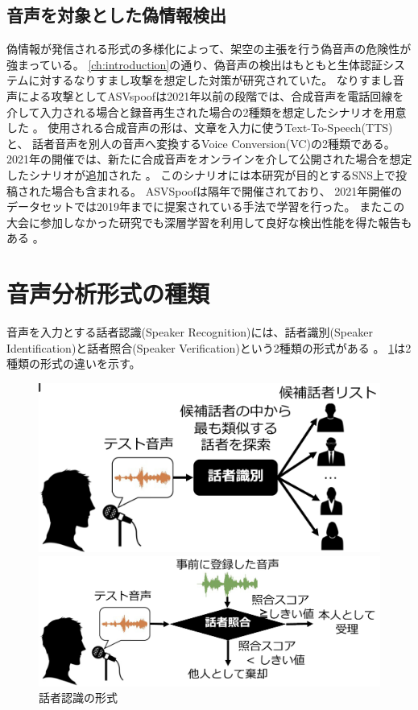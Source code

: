 \subsection{音声を対象とした偽情報検出}
偽情報が発信される形式の多様化によって、架空の主張を行う偽音声の危険性が強まっている。
\cref{ch:introduction}の通り、偽音声の検出はもともと生体認証システムに対するなりすまし攻撃を想定した対策が研究されていた。
なりすまし音声による攻撃としてASVspoofは2021年以前の段階では、合成音声を電話回線を介して入力される場合と録音再生された場合の2種類を想定したシナリオを用意した \cite{7858696}。
使用される合成音声の形は、文章を入力に使うText-To-Speech(TTS)と、
話者音声を別人の音声へ変換するVoice Conversion(VC)の2種類である。
2021年の開催では、新たに合成音声をオンラインを介して公開された場合を想定したシナリオが追加された \cite{yamagishi21_asvspoof}。
このシナリオには本研究が目的とするSNS上で投稿された場合も含まれる。
ASVSpoofは隔年で開催されており、
2021年開催のデータセットでは2019年までに提案されている手法で学習を行った。
またこの大会に参加しなかった研究でも深層学習を利用して良好な検出性能を得た報告もある \cite{10.1145/3394171.3413716}。

\section{音声分析形式の種類}
音声を入力とする話者認識(Speaker Recognition)には、話者識別(Speaker Identification)と話者照合(Speaker Verification)という2種類の形式がある \cite{FURUI1997859,628714,5745552}。
\cref{fig:speaker_recog}は2種類の形式の違いを示す。

\begin{figure}[p]
    \centering
    \begin{minipage}{0.9\linewidth}
        \centering
        \includegraphics[width=0.8\linewidth]{figures/sd.png}
    \end{minipage}
    \begin{minipage}{0.9\linewidth}
        \centering
        \includegraphics[width=0.8\linewidth]{figures/sv.png}
    \end{minipage}
    \caption{話者認識の形式 \cite{俵直弘2022}}
    \label{fig:speaker_recog}
\end{figure}

